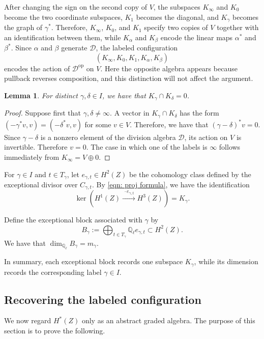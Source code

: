 \documentclass[11pt, reqno]{amsart}
\newtheorem{lemma}[theorem]{Lemma}
\theoremstyle{definition}
\newcommand\QQ{\mathbb{Q}}
\begin{document}
After changing the sign on the second copy of $V$, the subspaces
$K_\infty$ and $K_0$ become the two coordinate subspaces, $K_1$ becomes
the diagonal, and $K_\gamma$ becomes the graph of $\gamma^*$.  
Therefore, $K_\infty$, $K_0$, and $K_1$ specify two copies of $V$ together with an
identification between them, while $K_\alpha$ and $K_\beta$ encode the
linear maps $\alpha^*$ and $\beta^*$.  Since $\alpha$ and $\beta$
generate $\mathcal D$, the labeled configuration
\[
(K_\infty,K_0,K_1,K_\alpha,K_\beta)
\]
encodes the action of $\mathcal D^{\mathrm{op}}$ on $V$.  Here the
opposite algebra appears because pullback reverses composition, and this
distinction will not affect the argument.

\begin{lemma}
\label{lem:transverse-subspaces}
For distinct $\gamma,\delta\in I$, we have that $K_\gamma\cap K_\delta=0$.
\end{lemma}

\begin{proof}
Suppose first that $\gamma,\delta\neq\infty$.  A vector in
$K_\gamma\cap K_\delta$ has the form $(-\gamma^*v,v)=(-\delta^*v,v)$
for some $v\in V$.  Therefore, we have that $(\gamma-\delta)^*v=0$.
Since $\gamma-\delta$ is a nonzero element of the division algebra
$\mathcal D$, its action on $V$ is invertible.  Therefore $v=0$.  The
case in which one of the labels is $\infty$ follows immediately from
$K_\infty=V\oplus 0$.
\end{proof}

For $\gamma\in I$ and $t\in T_\gamma$, let $e_{\gamma,t}\in H^2(Z)$ be the cohomology class defined by the exceptional divisor over $C_{\gamma,t}$.  
By \eqref{eqn: proj formula}, we have the identification
\[
\ker\left(
H^1(Z)\xrightarrow{\ \cdot e_{\gamma,t}\ }H^3(Z)
\right)
=
K_\gamma.
\]

Define the exceptional block associated with $\gamma$ by
\[
B_\gamma:=
\bigoplus_{t\in T_\gamma}\QQ_\ell e_{\gamma,t}
\subset H^2(Z).
\]
We have that $\dim_{\QQ_\ell}B_\gamma=m_\gamma$.

In summary, each exceptional block records one subspace $K_\gamma$, while its
dimension records the corresponding label $\gamma\in I$.  


\subsection{Recovering the labeled configuration}
\label{subsubsec:recovering-configuration}\;

We now regard $H^*(Z)$ only as an abstract graded algebra.  The purpose of
this section is to prove the following.
\end{document}

